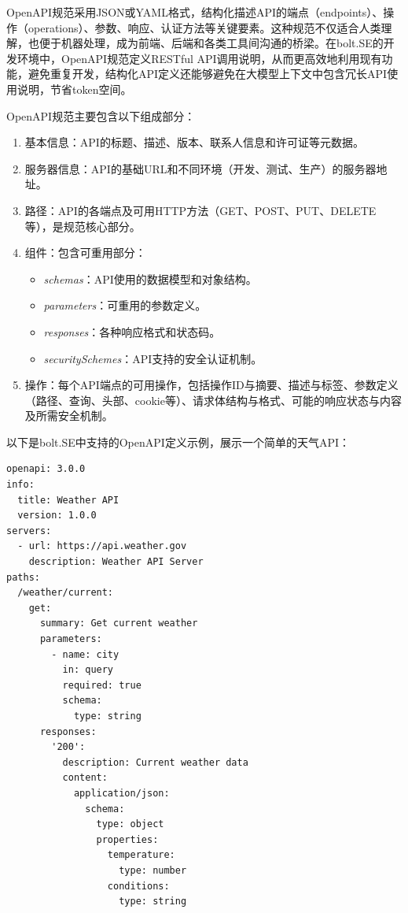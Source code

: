OpenAPI规范采用JSON或YAML格式，结构化描述API的端点（endpoints）、操作（operations）、参数、响应、认证方法等关键要素。这种规范不仅适合人类理解，也便于机器处理，成为前端、后端和各类工具间沟通的桥梁。在bolt.SE的开发环境中，OpenAPI规范定义RESTful API调用说明，从而更高效地利用现有功能，避免重复开发，结构化API定义还能够避免在大模型上下文中包含冗长API使用说明，节省token空间。

OpenAPI规范主要包含以下组成部分\cite{openapi2023spec}：

\begin{enumerate}
  \item 基本信息：API的标题、描述、版本、联系人信息和许可证等元数据。
  
  \item 服务器信息：API的基础URL和不同环境（开发、测试、生产）的服务器地址。
  
  \item 路径：API的各端点及可用HTTP方法（GET、POST、PUT、DELETE等），是规范核心部分。
  
  \item 组件：包含可重用部分：
    \begin{itemize}
      \item \textit{schemas}：API使用的数据模型和对象结构。
      \item \textit{parameters}：可重用的参数定义。
      \item \textit{responses}：各种响应格式和状态码。
      \item \textit{securitySchemes}：API支持的安全认证机制。
    \end{itemize}
  
  \item 操作：每个API端点的可用操作，包括操作ID与摘要、描述与标签、参数定义（路径、查询、头部、cookie等）、请求体结构与格式、可能的响应状态与内容及所需安全机制。
\end{enumerate}

以下是bolt.SE中支持的OpenAPI定义示例，展示一个简单的天气API：

\begin{verbatim}
openapi: 3.0.0
info:
  title: Weather API
  version: 1.0.0
servers:
  - url: https://api.weather.gov
    description: Weather API Server
paths:
  /weather/current:
    get:
      summary: Get current weather
      parameters:
        - name: city
          in: query
          required: true
          schema:
            type: string
      responses:
        '200':
          description: Current weather data
          content:
            application/json:
              schema:
                type: object
                properties:
                  temperature:
                    type: number
                  conditions:
                    type: string
\end{verbatim}

